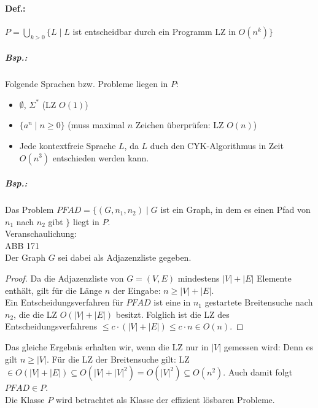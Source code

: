 \paragraph{Def.:} $P=\bigcup_{k>0} \{ L\;|\; L$ ist entscheidbar durch ein Programm LZ in $O(n^k)\}$
\subparagraph{Bsp.:} Folgende Sprachen bzw. Probleme liegen in $P$:
\begin{itemize}
\item $\emptyset$, $\Sigma^*$ (LZ $O(1)$)
\item $\{a^n\;| \; n\geq 0\}$ (muss maximal $n$ Zeichen überprüfen: LZ $O(n)$)
\item Jede kontextfreie Sprache $L$, da $L$ duch den CYK-Algorithmus in Zeit $O(n^3)$ entschieden werden kann.
\end{itemize}
\subparagraph{Bsp.:} Das Problem $PFAD=\{(G,n_1,n_2)\;|\; G$ ist ein Graph, in dem es einen Pfad von $n_1$ nach $n_2$ gibt $\}$ liegt in $P$.\\
Veranschaulichung:\\
ABB 171\\
Der Graph $G$ sei dabei als Adjazenzliste gegeben.
\begin{proof}
Da die Adjazenzliste von $G=(V,E)$ mindestens $|V|+|E|$ Elemente enthält, gilt für die Länge $n$ der Eingabe: $n\geq |V|+|E|$.\\
Ein Entscheidungsverfahren für $PFAD$ ist eine in $n_1$ gestartete Breitensuche nach $n_2$, die die LZ $O(|V|+|E|)$ besitzt. Folglich ist die LZ des Entscheidungsverfahrens $\leq c \cdot (|V|+|E|) \leq c \cdot n \in O(n)$. 
\end{proof}
Das gleiche Ergebnis erhalten wir, wenn die LZ nur in $|V|$ gemessen wird: Denn es gilt $n \geq |V|$. Für die LZ der Breitensuche gilt: LZ$\in O(|V|+|E|)\subseteq O (|V|+|V|^2)=O(|V|^2)\subseteq O(n^2)$.  Auch damit folgt $PFAD \in P$.\medskip\\
Die Klasse $P$ wird betrachtet als Klasse der effizient lösbaren Probleme.

